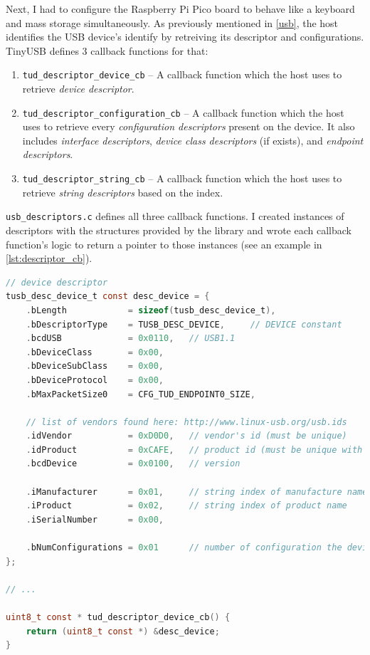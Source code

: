 Next, I had to configure the Raspberry Pi Pico board to behave like a keyboard and mass storage simultaneously. As previously mentioned in \autoref{usb}, the host identifies the USB device's identify by retreiving its descriptor and configurations. TinyUSB defines 3 callback functions for that:
\begin{enumerate}
    \item \verb|tud_descriptor_device_cb| -- A callback function which the host uses to retrieve \emph{device descriptor}.
    \item \verb|tud_descriptor_configuration_cb| -- A callback function which the host uses to retrieve every \emph{configuration descriptors} present on the device. It also includes \emph{interface descriptors}, \emph{device class descriptors} (if exists), and \emph{endpoint descriptors}.
    \item \verb|tud_descriptor_string_cb| -- A callback function which the host uses to retrieve \emph{string descriptors} based on the index.
\end{enumerate}

\verb|usb_descriptors.c| defines all three callback functions. I created instances of descriptors with the structures provided by the library and wrote each callback function's logic to return a pointer to those instances (see an example in \autoref{lst:descriptor_cb}).

\begin{lstlisting}[caption={Definition of the \emph{device descriptor} and its callback function used in \texttt{usb\_descriptors.c}.},
                   label={lst:descriptor_cb},
                   language=c]
// device descriptor
tusb_desc_device_t const desc_device = {
    .bLength            = sizeof(tusb_desc_device_t),
    .bDescriptorType    = TUSB_DESC_DEVICE,     // DEVICE constant
    .bcdUSB             = 0x0110,   // USB1.1
    .bDeviceClass       = 0x00,
    .bDeviceSubClass    = 0x00,
    .bDeviceProtocol    = 0x00,
    .bMaxPacketSize0    = CFG_TUD_ENDPOINT0_SIZE,

    // list of vendors found here: http://www.linux-usb.org/usb.ids
    .idVendor           = 0xD0D0,   // vendor's id (must be unique)
    .idProduct          = 0xCAFE,   // product id (must be unique with vendor)
    .bcdDevice          = 0x0100,   // version

    .iManufacturer      = 0x01,     // string index of manufacture name
    .iProduct           = 0x02,     // string index of product name
    .iSerialNumber      = 0x00,

    .bNumConfigurations = 0x01      // number of configuration the device supports
};

// ...

uint8_t const * tud_descriptor_device_cb() {
    return (uint8_t const *) &desc_device;
}
\end{lstlisting}

